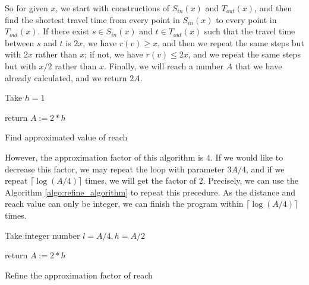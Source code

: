\documentclass[titlepage,11pt,a4paper]{article}
\begin{document}
So for given $x$, we start with constructions of $S_{in}(x)$ and $T_{out}(x)$, and then find the shortest travel time from every point in $S_{in}(x)$ to every point in $T_{out}(x)$. If there exist $s\in S_{in}(x)$ and $t\in T_{out}(x)$ such that the travel time between $s$ and $t$ is $2x$, we have $r(v)\geq x$, and then we repeat the same steps but with $2x$ rather than $x$; if not, we have $r(v)\leq 2x$, and we repeat the same steps but with $x/2$ rather than $x$. Finally, we will reach a number $A$ that we have already calculated, and we return $2A$.


\begin{algorithm}[H]
 \KwResult{a value A such that $r(v)$ is in the range $[A/4, A)$.}
 Take $h=1$\;


return $A := 2*h$\;

\caption{Find approximated value of reach}
\end{algorithm}

However, the approximation factor of this algorithm is $4$. If we would like to decrease this factor, we may repeat the loop with parameter $3A/4$, and if we repeat $\lceil\log(A/4)\rceil$ times, we will get the factor of $2$. Precisely, we can use the Algorithm \ref{algo:refine_algorithm} to repeat this precedure. As the distance and reach value can only be integer, we can finish the program within $\lceil\log(A/4)\rceil$ times.\\

\begin{algorithm}[H]
 \KwData{value $A$ such that $r(v)$ is in the range $[A/4, A)$.}
 \KwResult{value $A^*$ such that $r(v)$ is in the range $[A^*/2, A^*)$.}
 Take integer number $l=A/4, h=A/2$\;

return $A := 2*h$\;

\caption{Refine the approximation factor of reach}
\label{algo:refine_algorithm}
\end{algorithm}
\end{document}
